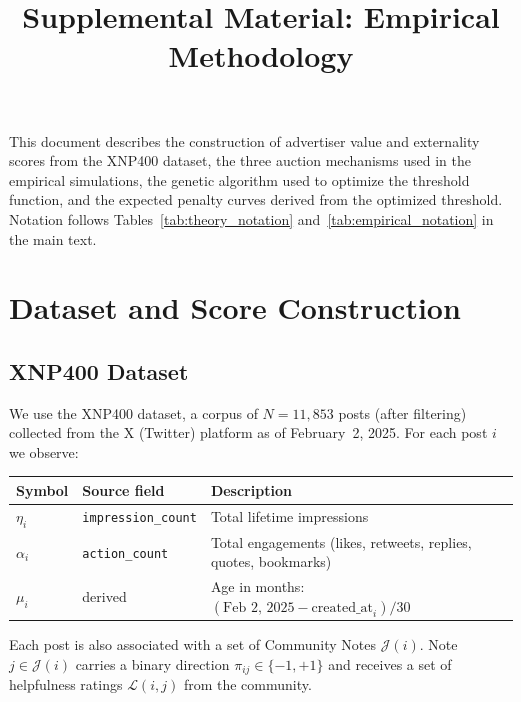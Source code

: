 \documentclass[11pt]{article}
\title{Supplemental Material: Empirical Methodology}
\date{}
\begin{document}
\maketitle

\tableofcontents
\bigskip

\noindent This document describes the construction of advertiser value and externality
scores from the XNP400 dataset, the three auction mechanisms used in the
empirical simulations, the genetic algorithm used to optimize the threshold
function, and the expected penalty curves derived from the optimized threshold.
Notation follows Tables~\ref{tab:theory_notation} and~\ref{tab:empirical_notation}
in the main text.

\section{Dataset and Score Construction}
\label{sec:data}

\subsection{XNP400 Dataset}

We use the XNP400 dataset, a corpus of $N = 11{,}853$ posts (after filtering)
collected from the X (Twitter) platform as of February~2, 2025.
For each post $i$ we observe:

\begin{center}
\begin{tabularx}{\textwidth}{llX}
\toprule
Symbol & Source field & Description \\
\midrule
$\eta_i$ & \texttt{impression\_count} & Total lifetime impressions \\
$\alpha_i$ & \texttt{action\_count}   & Total engagements (likes, retweets, replies,
                                        quotes, bookmarks) \\
$\mu_i$   & derived                   & Age in months: $(\text{Feb 2, 2025} -
                                        \text{created\_at}_i)/30$ \\
\bottomrule
\end{tabularx}
\end{center}

\noindent
Each post is also associated with a set of Community Notes $\mathcal{J}(i)$.
Note $j \in \mathcal{J}(i)$ carries a binary direction $\pi_{ij} \in \{-1,+1\}$
and receives a set of helpfulness ratings $\mathcal{L}(i,j)$ from the community.
\end{document}
